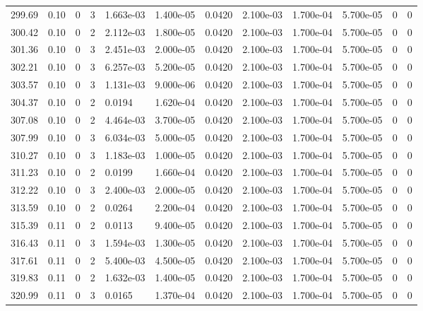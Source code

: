 \documentclass[preview]{standalone}
\begin{document}
{{{{{{{{\begin{tabular}{L{1.2cm}C{1.2cm} C{0.3cm}C{0.5cm} C{1.4cm}C{1.4cm} C{1.4cm}C{1.4cm} C{1.6cm}C{1.6cm} C{1.6cm}C{1.6cm}}
  299.69  &  0.10  & 0     &  3 &  1.663e-03  & 1.400e-05  &  0.0420&   2.100e-03& 1.700e-04 & 5.700e-05   &  0 & 0  \\ 
  300.42  &  0.10  & 0     &  2 &  2.112e-03  & 1.800e-05  &  0.0420&   2.100e-03& 1.700e-04 & 5.700e-05   &  0 & 0  \\ 
  301.36  &  0.10  & 0     &  3 &  2.451e-03  & 2.000e-05  &  0.0420&   2.100e-03& 1.700e-04 & 5.700e-05   &  0 & 0  \\ 
  302.21  &  0.10  & 0     &  3 &  6.257e-03  & 5.200e-05  &  0.0420&   2.100e-03& 1.700e-04 & 5.700e-05   &  0 & 0  \\ 
  303.57  &  0.10  & 0     &  3 &  1.131e-03  & 9.000e-06  &  0.0420&   2.100e-03& 1.700e-04 & 5.700e-05   &  0 & 0  \\ 
  304.37  &  0.10  & 0     &  2 &  0.0194  & 1.620e-04  &  0.0420&   2.100e-03& 1.700e-04 & 5.700e-05   &  0 & 0  \\ 
  307.08  &  0.10  & 0     &  2 &  4.464e-03  & 3.700e-05  &  0.0420&   2.100e-03& 1.700e-04 & 5.700e-05   &  0 & 0  \\ 
  307.99  &  0.10  & 0     &  3 &  6.034e-03  & 5.000e-05  &  0.0420&   2.100e-03& 1.700e-04 & 5.700e-05   &  0 & 0  \\ 
  310.27  &  0.10  & 0     &  3 &  1.183e-03  & 1.000e-05  &  0.0420&   2.100e-03& 1.700e-04 & 5.700e-05   &  0 & 0  \\ 
  311.23  &  0.10  & 0     &  2 &  0.0199  & 1.660e-04  &  0.0420&   2.100e-03& 1.700e-04 & 5.700e-05   &  0 & 0  \\ 
  312.22  &  0.10  & 0     &  3 &  2.400e-03  & 2.000e-05  &  0.0420&   2.100e-03& 1.700e-04 & 5.700e-05   &  0 & 0  \\ 
  313.59  &  0.10  & 0     &  2 &  0.0264  & 2.200e-04  &  0.0420&   2.100e-03& 1.700e-04 & 5.700e-05   &  0 & 0  \\ 
  315.39  &  0.11  & 0     &  2 &  0.0113  & 9.400e-05  &  0.0420&   2.100e-03& 1.700e-04 & 5.700e-05   &  0 & 0  \\ 
  316.43  &  0.11  & 0     &  3 &  1.594e-03  & 1.300e-05  &  0.0420&   2.100e-03& 1.700e-04 & 5.700e-05   &  0 & 0  \\ 
  317.61  &  0.11  & 0     &  2 &  5.400e-03  & 4.500e-05  &  0.0420&   2.100e-03& 1.700e-04 & 5.700e-05   &  0 & 0  \\ 
  319.83  &  0.11  & 0     &  2 &  1.632e-03  & 1.400e-05  &  0.0420&   2.100e-03& 1.700e-04 & 5.700e-05   &  0 & 0  \\ 
  320.99  &  0.11  & 0     &  3 &  0.0165  & 1.370e-04  &  0.0420&   2.100e-03& 1.700e-04 & 5.700e-05   &  0 & 0  \\ 

\end{tabular}}}}}}}}}
\end{document}
